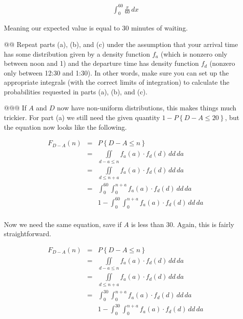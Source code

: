 \documentclass[11pt]{article}\usepackage[]{graphicx}\usepackage[]{xcolor}
\begin{document}
\begin{easylist}[enumerate]
    \begin{equation}
        \begin{aligned}
            \int_0^{60} \frac{x}{60} \, dx
        \end{aligned}
    \end{equation}

    Meaning our expected value is equal to $30$ minutes of waiting.

    @@ Repeat parts (a), (b), and (c) under the assumption that your arrival time has some distribution given by a
    density function $f_a$ (which is nonzero only between noon and 1) and the departure time has density function $f_d$
    (nonzero only between 12:30 and 1:30). In other words, make sure you can set up the appropriate integrals (with the
    correct limits of integration) to calculate the probabilities requested in parts (a), (b), and (c).

    @@@ If $A$ and $D$ now have non-uniform distributions, this makes things much trickier. For part (a) we still need
    the given quantity $1 - P\left\{ D - A \le 20 \right\}$, but the equation now looks like the following.

    \begin{equation}
        \begin{aligned}
            F_{D - A}(n) &=& P\left\{ D - A \le n \right\}\\
                         &=& \iint\limits_{d - a \le n} f_a(a) \cdot f_d(d) \, dd \, da\\
                         &=& \iint\limits_{d \le n + a} f_a(a) \cdot f_d(d) \, dd \, da\\
                         &=& \int_0^{60} \int_0^{n+a} f_a(a) \cdot f_d(d) \, dd \, da\\
            && \boxed{1 - \int_0^{60} \int_0^{n+a} f_a(a) \cdot f_d(d) \, dd \, da}\\
        \end{aligned}
    \end{equation}

    Now we need the same equation, save if $A$ is less than 30. Again, this is fairly straightforward.

    \begin{equation}
        \begin{aligned}
            F_{D-A}(n) &=& P\left\{ D - A \le n \right\}\\
                       &=& \iint\limits_{d - a \le n} f_a(a) \cdot f_d(d) \, dd \, da\\
                       &=& \iint\limits_{d \le n + a} f_a(a) \cdot f_d(d) \, dd \, da\\
                       &=& \int_0^{30} \int_0^{n+a} f_a(a) \cdot f_d(d) \, dd \, da\\
                       && \boxed{1 - \int_0^{30} \int_0^{n+a} f_a(a) \cdot f_d(d) \, dd \, da}\\
        \end{aligned}
    \end{equation}


\end{easylist}
\end{document}
